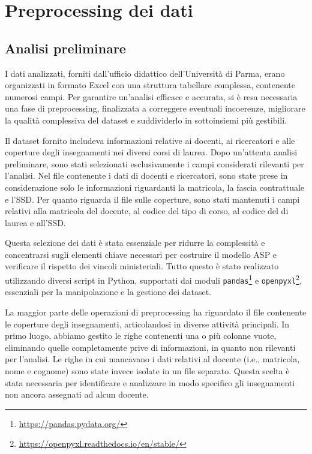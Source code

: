 \section{Preprocessing dei dati}
\label{sec:pre-proc}

\subsection{Analisi preliminare}

I dati analizzati, forniti dall'ufficio didattico dell'Università di Parma, 
erano organizzati in formato Excel con una struttura tabellare complessa, contenente 
numerosi campi. Per garantire un'analisi efficace e accurata, si è resa necessaria una 
fase di preprocessing, finalizzata a correggere eventuali incoerenze, migliorare la 
qualità complessiva del dataset e suddividerlo in sottoinsiemi più gestibili.

Il dataset fornito includeva informazioni relative ai docenti, ai ricercatori e alle 
coperture degli insegnamenti nei diversi corsi di laurea. Dopo un'attenta analisi 
preliminare, sono stati selezionati esclusivamente i campi considerati rilevanti per 
l'analisi. Nel file contenente i dati di docenti e ricercatori, sono state prese in 
considerazione solo le informazioni riguardanti la matricola, la fascia contrattuale 
e l'SSD. Per quanto riguarda il file sulle coperture, sono stati mantenuti i campi 
relativi alla matricola del docente, al codice del tipo di corso, al codice del 
di laurea e all'SSD.

Questa selezione dei dati è stata essenziale per ridurre la complessità e concentrarsi 
sugli elementi chiave necessari per costruire il modello ASP e verificare il rispetto 
dei vincoli ministeriali. Tutto questo è stato realizzato utilizzando diversi script in 
Python, supportati dai moduli \texttt{pandas}\footnote{\url{https://pandas.pydata.org/}} 
e \texttt{openpyxl}\footnote{\url{https://openpyxl.readthedocs.io/en/stable/}}, 
essenziali per la manipolazione e la gestione dei dataset.

La maggior parte delle operazioni di preprocessing ha riguardato il file contenente 
le coperture degli insegnamenti, articolandosi in diverse attività principali. 
In primo luogo, abbiamo gestito le righe contenenti una o più colonne vuote, 
eliminando quelle completamente prive di informazioni, in quanto non rilevanti 
per l'analisi. Le righe in cui mancavano i dati relativi al docente (i.e., matricola, 
nome e cognome) sono state invece isolate in un file separato. Questa scelta è stata 
necessaria per identificare e analizzare in modo specifico gli insegnamenti non 
ancora assegnati ad alcun docente.

